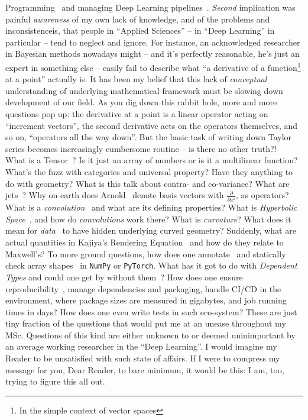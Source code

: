 Programming~\citep{dexlang,mcdonellGPU} and managing Deep Learning
pipelines~\citep{mokhov2018build}.  \emph{Second} implication was painful
\emph{awareness} of my own lack of knowledge, and of the problems and
inconsistenceis, that people in ``Applied Sciences'' -- in ``Deep Learning'' in
particular -- tend to neglect and ignore.  For instance, an acknowledged
researcher in Bayesian methods nowadays might -- and it's perfectly reasonable,
he's just an expert in something else -- easily fail to describe what ``a
derivative of a function\footnote{In the simple context of vector spaces} at a
point'' actually is. It has been my belief that this lack of \emph{conceptual}
understanding of underlying mathematical framework must be slowing down
development of our field. As you dig down this rabbit hole, more and more
questions pop up: the derivative at a point is a linear operator acting on
``increment vectors'', the second derivative acts on the operators themselves,
and so on, ``operators all the way down''. But the basic task of writing down
Taylor series becomes increasingly cumbersome routine -- is there no other
truth?!~\citep{elliott2018simple} What is a
Tensor~\citep{bradley2020interface}? Is it just an array of numbers or is it a
multilinear function? What's the fuzz with categories and universal property?
Have they anything to do with geometry?  What is this talk about contra- and
co-variance?  What are jets~\citep{betancourt2018geometric}?  Why on earth does
Arnold~\citep{arnoldPDEs} denote basis vectors with \( \frac{\partial}{\partial
x^i} \), as operators?  What is a
\emph{convolution}~\citep{feichtingerFAHA,cohen2018general,e2cnn} and what are
its defining properties? What is \emph{Hyperbolic Space}~\citep{ganeaHNNs}, and
how do \emph{convolutions} work there? What is \emph{curvature}? What does it
mean for \emph{data}~\citep{khrulkov} to have hidden underlying curved
geometry? Suddenly, what are actual quantities in Kajiya's Rendering
Equation~\citep{kajiya1986rendering} and how do they relate to Maxwell's? To
more ground questions, how does one
annotate~\citep{documentationResearch,struturingDocumentation,doctest,doctestRust,doctestCpp}
and statically check array shapes~\citep{rush2019tensor,rush2019tensor2} in
\texttt{NumPy} or \texttt{PyTorch}. What has it got to do with
\emph{Dependent Types} and could one get by without them~\citep{dexlang,slap}?
How does one ensure
reproducibility~\citep{inriaSacred,catalyst,pytorchLightning,xinLiangPipelines,},
manage dependencies and packaging, handle CI/CD in the environment, where
package sizes are measured in gigabytes, and job running times in days?  How
does one even write tests in such eco-system?  These are just tiny fraction of
the questions that would put me at an unease throughout my MSc. Questions of
this kind are either unknown to or deemed uninimportant by an average working
researcher in the ``Deep Learning''. I would imagine my Reader to be
unsatisfied with such state of affairs. If I were to compress my message for
you, Dear Reader, to bare minimum, it would be this: I am, too, trying to
figure this all out.

